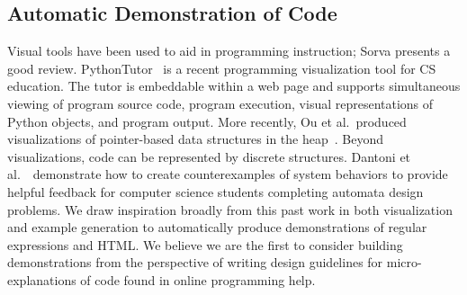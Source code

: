 \subsection{Automatic Demonstration of Code}

Visual tools have been used to aid in programming instruction; Sorva \cite{sorva_visual_2012} presents a good review.
PythonTutor~\cite{guo_online_2013} is a recent programming visualization tool for CS education.
The tutor is embeddable within a web page and supports simultaneous viewing of program source code, program execution, visual representations of Python objects, and program output.
More recently, Ou et al.\ produced visualizations of pointer-based data structures in the heap~\cite{ou_interactive_2015}.
Beyond visualizations, code can be represented by discrete structures.
Dantoni et al.~\cite{dantoni_how_2015}\ demonstrate how to create counterexamples of system behaviors to provide helpful feedback for computer science students completing automata design problems.
We draw inspiration broadly from this past work in both visualization and example generation to automatically produce demonstrations of regular expressions and HTML\@.
We believe we are the first to consider building demonstrations from the perspective of writing design guidelines for micro-explanations of code found in online programming help. 
